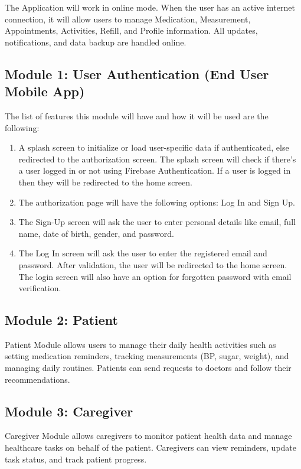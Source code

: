 \documentclass[12pt, a4paper, oneside]{report}
\begin{document}
The Application will work in online mode. When the user has an active internet connection, it will allow users to manage Medication, Measurement, Appointments, Activities, Refill, and Profile information. All updates, notifications, and data backup are handled online.

\subsection{Module 1: User Authentication (End User Mobile App)}
The list of features this module will have and how it will be used are the following:
\begin{enumerate}
    \item A splash screen to initialize or load user-specific data if authenticated, else redirected to the authorization screen. The splash screen will check if there's a user logged in or not using Firebase Authentication. If a user is logged in then they will be redirected to the home screen.
    \item The authorization page will have the following options: Log In and Sign Up.
    \item The Sign-Up screen will ask the user to enter personal details like email, full name, date of birth, gender, and password.
    \item The Log In screen will ask the user to enter the registered email and password. After validation, the user will be redirected to the home screen. The login screen will also have an option for forgotten password with email verification.
\end{enumerate}

\subsection{Module 2: Patient}
Patient Module allows users to manage their daily health activities such as setting medication reminders, tracking measurements (BP, sugar, weight), and managing daily routines. Patients can send requests to doctors and follow their recommendations.

\subsection{Module 3: Caregiver}
Caregiver Module allows caregivers to monitor patient health data and manage healthcare tasks on behalf of the patient. Caregivers can view reminders, update task status, and track patient progress.
\end{document}
